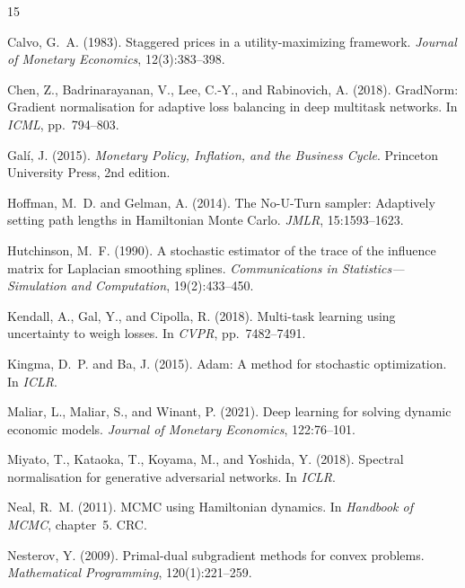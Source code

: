 \documentclass[11pt,a4paper]{article}
\theoremstyle{definition}
\begin{document}
	
	
	\begin{thebibliography}{15}
		
		Calvo, G.~A. (1983).
		Staggered prices in a utility-maximizing framework.
		\emph{Journal of Monetary Economics}, 12(3):383--398.
		
		Chen, Z., Badrinarayanan, V., Lee, C.-Y., and Rabinovich, A. (2018).
		GradNorm: Gradient normalisation for adaptive loss balancing in deep multitask networks.
		In \emph{ICML}, pp.~794--803.
		
		Gal{\'i}, J. (2015).
		\emph{Monetary Policy, Inflation, and the Business Cycle}.
		Princeton University Press, 2nd edition.
		
		Hoffman, M.~D. and Gelman, A. (2014).
		The No-U-Turn sampler: Adaptively setting path lengths in Hamiltonian Monte Carlo.
		\emph{JMLR}, 15:1593--1623.
		
		Hutchinson, M.~F. (1990).
		A stochastic estimator of the trace of the influence matrix for Laplacian smoothing splines.
		\emph{Communications in Statistics---Simulation and Computation}, 19(2):433--450.
		
		Kendall, A., Gal, Y., and Cipolla, R. (2018).
		Multi-task learning using uncertainty to weigh losses.
		In \emph{CVPR}, pp.~7482--7491.
		
		Kingma, D.~P. and Ba, J. (2015).
		Adam: A method for stochastic optimization.
		In \emph{ICLR}.
		
		Maliar, L., Maliar, S., and Winant, P. (2021).
		Deep learning for solving dynamic economic models.
		\emph{Journal of Monetary Economics}, 122:76--101.
		
		Miyato, T., Kataoka, T., Koyama, M., and Yoshida, Y. (2018).
		Spectral normalisation for generative adversarial networks.
		In \emph{ICLR}.
		
		Neal, R.~M. (2011).
		MCMC using Hamiltonian dynamics.
		In \emph{Handbook of MCMC}, chapter~5. CRC.
		
		Nesterov, Y. (2009).
		Primal-dual subgradient methods for convex problems.
		\emph{Mathematical Programming}, 120(1):221--259.
		

\end{thebibliography}
\end{document}
